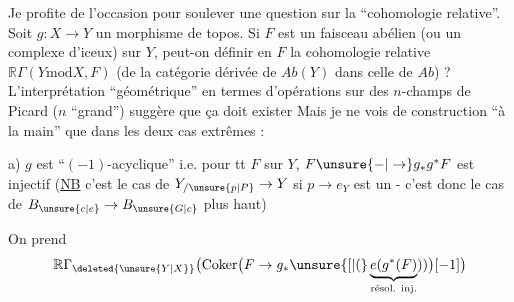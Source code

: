 
Je profite de l'occasion pour soulever une question sur la ``cohomologie relative''. Soit $g:X\to Y$ un morphisme de topos. Si $F$ est un faisceau abélien (ou un complexe d'iceux) sur $Y$, peut-on définir  en $F$ la cohomologie relative $\mathbb R\Gamma(Y\mathbin{\mathrm{mod}}X,F)$ (de la catégorie dérivée de $\mathit{Ab}(Y)$ dans celle de $\mathit{Ab}$) ? L'interprétation ``géométrique'' en termes d'opérations sur des $n$-champs de Picard ($n$ ``grand'') suggère que ça doit exister
Mais je ne vois de construction  ``à la main'' que dans les deux cas extrêmes :

a) $g$ est ``$(-1)$-acyclique'' i.e. pour tt $F$ sur $Y$, $F\unsure{\mathord{-}|\to}g_{*}g^{*}F$ est injectif (\uline{NB} c'est le cas de $Y_{/\unsure{p|P}}\to Y$ si $p\to e_{Y}$ est un  - c'est donc le cas de $B_{\unsure{c|e}}\to B_{\unsure{G|c}}$ plus haut)

On prend
\[
\mathbb R\Gamma_{\deleted{\unsure{Y|X}}}\bigl(\operatorname{Coker}\bigl(F\to g_{*}\unsure{[|(}\underbrace{e(g^{*}(F)}_{\text{résol. inj.}}))\bigr)[-1]\bigr)
\]
